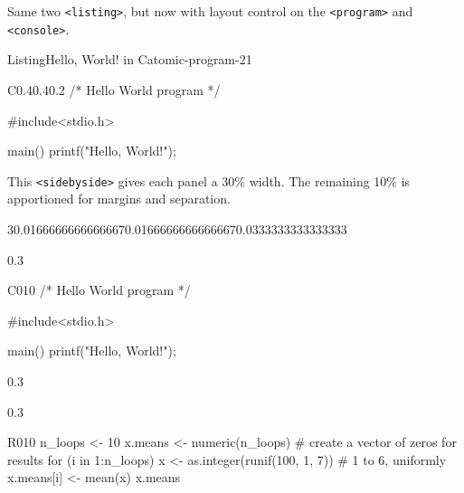 \documentclass{sn-jnl}
\theoremstyle{thmstyleone}%
\theoremstyle{thmstyletwo}%
\theoremstyle{thmstylethree}%
\newcommand{\mono}[1]{\texttt{#1}}
\numberwithin{equation}{section}
\newcommand{\consoleinput}[1]{\textbf{#1}}
\begin{document}
Same two \mono{<listing>}, but now with layout control on the \mono{<program>} and \mono{<console>}.%
\begin{listingptx}{Listing}{Hello, World! in C}{atomic-program-21}{}%
\begin{program}{C}{0.4}{0.4}{0.2}
/* Hello World program */

#include<stdio.h>

main()
{
    printf("Hello, World!");
}
\end{program}
\tcblower
\end{listingptx}%
%
This \mono{<sidebyside>} gives each panel a 30\% width.  The remaining 10\% is apportioned for margins and separation.%
\begin{sidebyside}{3}{0.0166666666666667}{0.0166666666666667}{0.0333333333333333}%
\begin{sbspanel}{0.3}%
\begin{program}{C}{0}{1}{0}
/* Hello World program */

#include<stdio.h>

main()
{
    printf("Hello, World!");
}
\end{program}
\end{sbspanel}%
\begin{sbspanel}{0.3}%
\end{sbspanel}%
\begin{sbspanel}{0.3}%
\begin{program}{R}{0}{1}{0}
n_loops <- 10
x.means <- numeric(n_loops)  # create a vector of zeros for results
for (i in 1:n_loops){
    x <- as.integer(runif(100, 1, 7))  # 1 to 6, uniformly
    x.means[i] <- mean(x)
}
x.means
\end{program}
\end{sbspanel}%
\end{sidebyside}%
\end{document}
